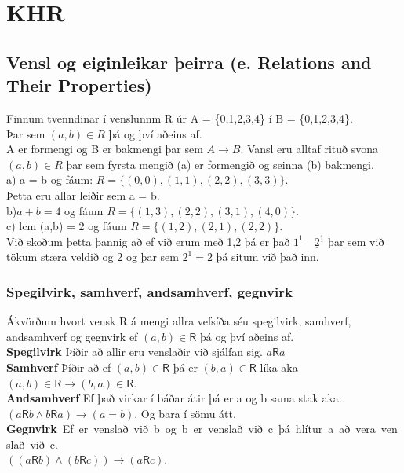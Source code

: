 \section{KHR}
\subsection{Vensl og eiginleikar þeirra (e. Relations and Their Properties)}
Finnum tvenndinar í venslunnm R úr A = \{0,1,2,3,4\} í B = \{0,1,2,3,4\}.\\ 
Þar sem $(a,b) \in R$ þá og því aðeins af.\\
A er formengi og B er bakmengi þar sem $A \rightarrow B$. Vansl eru alltaf rituð svona $(a,b) \in R$ þar sem fyrsta mengið (a) er formengið og seinna (b) bakmengi.\\

a) a = b og fáum: $R = \{(0,0), (1,1),(2,2),(3,3)\}$.\\ \hspace*{2.1em} Þetta eru allar leiðir sem a = b.\\

b)$a + b = 4$ og fáum $R = \{(1,3),(2,2),(3,1),(4,0)\}$.\\

c) lcm (a,b) = 2 og fáum $R = \{(1,2),(2,1),(2,2)\}$.\\ \hspace*{2.1em} Við skoðum þetta þannig að ef við erum með 1,2 þá er það $1^1 \quad \underline{2}^{\underline{1}}$ þar sem \hspace*{2.2em} við tökum stæra veldið og 2 og þar sem $2^1 = 2$ þá situm við það inn.
\subsubsection{Spegilvirk, samhverf, andsamhverf, gegnvirk}
Ákvörðum hvort vensk R á mengi allra vefsíða séu spegilvirk, samhverf, andsamhverf og gegnvirk ef $(a,b) \in \mathsf{R}$ þá og því aðeins af.\\
\textbf{Spegilvirk} Þíðir að allir eru venslaðir við sjálfan sig. $a\mathsf{R}a$\\
\textbf{Samhverf} Þíðir að ef $(a,b) \in \mathsf{R}$ þá er $(b,a) \in \mathsf{R}$ líka aka $(a,b) \in \mathsf{R} \rightarrow (b,a) \in \mathsf{R}$.\\
\textbf{Andsamhverf} Ef það virkar í báðar átir þá er a og b sama stak aka: \\$(a\mathsf{R}b \wedge b\mathsf{R}a) \rightarrow (a=b)$. Og bara í sömu átt.\\
\hbox{\textbf{Gegnvirk} Ef er venslað við b og b er venslað við c þá hlítur a að vera venslað við c.}\\
$((a\mathsf{R}b) \wedge (b\mathsf{R}c)) \rightarrow (a\mathsf{R}c)$.\\


